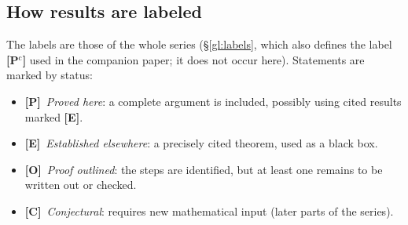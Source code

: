 \documentclass[12pt]{article}
\newcommand{\Pv}{\textbf{[P]}}
\newcommand{\Ev}{\textbf{[E]}}
\newcommand{\Ov}{\textbf{[O]}}
\newcommand{\Cv}{\textbf{[C]}}
\theoremstyle{plain}
\theoremstyle{definition}
\begin{document}
\subsection{How results are labeled}
The labels are those of the whole series (\S\ref{gl:labels}, which also defines the label \textbf{[P$^{\mathrm c}$]} used in the companion paper; it does not occur here). Statements are marked by status:
\begin{itemize}
\item \Pv\ \emph{Proved here}: a complete argument is included, possibly using cited results marked \Ev.
\item \Ev\ \emph{Established elsewhere}: a precisely cited theorem, used as a black box.
\item \Ov\ \emph{Proof outlined}: the steps are identified, but at least one remains to be written out or checked.
\item \Cv\ \emph{Conjectural}: requires new mathematical input (later parts of the series).
\end{itemize}
\end{document}
